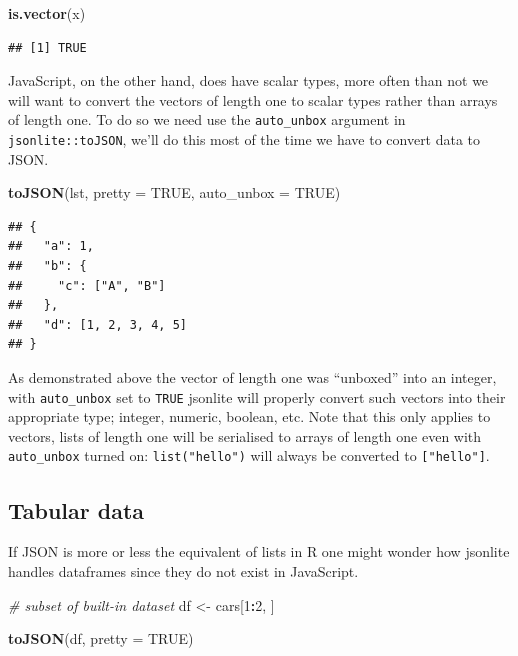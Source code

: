 \documentclass[
]{krantz}
\makeatletter
\newenvironment{Shaded}{\begin{snugshade}}{\end{snugshade}}
\newcommand{\CommentTok}[1]{\textcolor[rgb]{0.37,0.37,0.37}{\textit{#1}}}
\newcommand{\DataTypeTok}[1]{\textcolor[rgb]{0.27,0.27,0.27}{#1}}
\newcommand{\DecValTok}[1]{\textcolor[rgb]{0.06,0.06,0.06}{#1}}
\newcommand{\KeywordTok}[1]{\textcolor[rgb]{0.27,0.27,0.27}{\textbf{#1}}}
\newcommand{\NormalTok}[1]{#1}
\newcommand{\OperatorTok}[1]{\textcolor[rgb]{0.43,0.43,0.43}{\textbf{#1}}}
\newcommand{\OtherTok}[1]{\textcolor[rgb]{0.37,0.37,0.37}{#1}}
\newcommand{\StringTok}[1]{\textcolor[rgb]{0.5,0.5,0.5}{#1}}
\newenvironment{kframe}{%
\medskip{}
\setlength{\fboxsep}{.8em}
 \def\at@end@of@kframe{}%
 \ifinner\ifhmode%
  \def\at@end@of@kframe{\end{minipage}}%
  \begin{minipage}{\columnwidth}%
 \fi\fi%
 \def\FrameCommand##1{\hskip\@totalleftmargin \hskip-\fboxsep
 \colorbox{shadecolor}{##1}\hskip-\fboxsep
     \hskip-\linewidth \hskip-\@totalleftmargin \hskip\columnwidth}%
 \MakeFramed {\advance\hsize-\width
   \@totalleftmargin\z@ \linewidth\hsize
   \@setminipage}}%
 {\par\unskip\endMakeFramed%
 \at@end@of@kframe}
\renewenvironment{Shaded}{\begin{kframe}}{\end{kframe}}
\makeatother
\begin{document}
\begin{Shaded}
\begin{Highlighting}[]
\KeywordTok{is.vector}\NormalTok{(x)}
\end{Highlighting}
\end{Shaded}

\begin{verbatim}
## [1] TRUE
\end{verbatim}

JavaScript, on the other hand, does have scalar types, more often than not we will want to convert the vectors of length one to scalar types rather than arrays of length one. To do so we need use the \texttt{auto\_unbox} argument in \texttt{jsonlite::toJSON}, we'll do this most of the time we have to convert data to JSON.

\begin{Shaded}
\begin{Highlighting}[]
\KeywordTok{toJSON}\NormalTok{(lst, }\DataTypeTok{pretty =} \OtherTok{TRUE}\NormalTok{, }\DataTypeTok{auto\_unbox =} \OtherTok{TRUE}\NormalTok{)}
\end{Highlighting}
\end{Shaded}

\begin{verbatim}
## {
##   "a": 1,
##   "b": {
##     "c": ["A", "B"]
##   },
##   "d": [1, 2, 3, 4, 5]
## }
\end{verbatim}

As demonstrated above the vector of length one was ``unboxed'' into an integer, with \texttt{auto\_unbox} set to \texttt{TRUE} jsonlite will properly convert such vectors into their appropriate type; integer, numeric, boolean, etc. Note that this only applies to vectors, lists of length one will be serialised to arrays of length one even with \texttt{auto\_unbox} turned on: \texttt{list("hello")} will always be converted to \texttt{{[}"hello"{]}}.

\hypertarget{tabular-data}{%
\subsection{Tabular data}\label{tabular-data}}

If JSON is more or less the equivalent of lists in R one might wonder how jsonlite handles dataframes since they do not exist in JavaScript.

\begin{Shaded}
\begin{Highlighting}[]
\CommentTok{\# subset of built{-}in dataset}
\NormalTok{df <{-}}\StringTok{ }\NormalTok{cars[}\DecValTok{1}\OperatorTok{:}\DecValTok{2}\NormalTok{, ]}

\KeywordTok{toJSON}\NormalTok{(df, }\DataTypeTok{pretty =} \OtherTok{TRUE}\NormalTok{)}
\end{Highlighting}
\end{Shaded}
\end{document}
